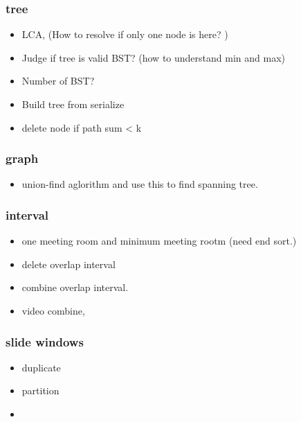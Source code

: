 \documentclass[a4paper,11pt,twoside]{book}
\begin{document}
\subsubsection{tree}
\begin{itemize}
	\item LCA, (How to resolve if only one node is here? )
	\item Judge if tree is valid BST? (how to understand min and max) 
	\item Number of BST?  
	\item Build tree from serialize
	\item delete node if path sum < k
\end{itemize}

\subsubsection{graph}

\begin{itemize}
	\item union-find aglorithm and use this to find spanning tree.
	
\end{itemize}

\subsubsection{interval}
\begin{itemize}
	\item one meeting room and minimum meeting rootm (need end sort.)
	\item delete overlap interval
	\item combine overlap interval.
	\item video combine, 
	
\end{itemize}

\subsubsection{slide windows}
\begin{itemize}
	\item duplicate
	\item partition
	\item 
\end{itemize}
\end{document}
